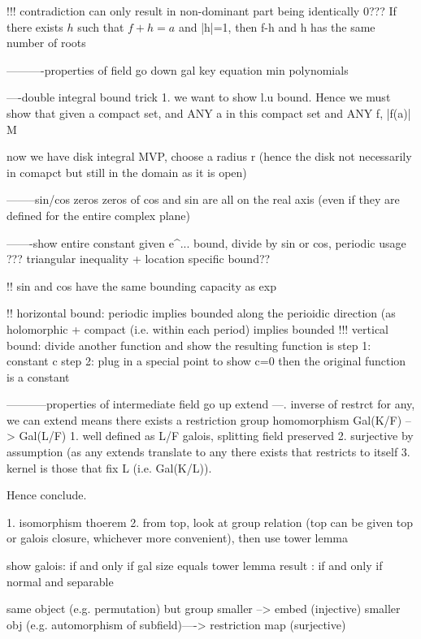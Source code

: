 {{!!! contradiction can only result in non-dominant part being identically 0???
If there exists $h$ such that $f + h = a$ and |h|=1, then f-h and h has the same number of roots





----------properties of field go down
gal key equation
min polynomials


----double integral bound trick
1. we want to show l.u bound. Hence we must show that given a compact set, and ANY a in this compact set and ANY f, |f(a)| \leq M

now we have disk integral MVP, choose a radius r (hence the disk not necessarily in comapct but still in the domain as it is open)


--------sin/cos zeros
zeros of cos and sin are all on the real axis (even if they are defined for the entire complex plane)

-------show entire constant given e^... bound, divide by sin or cos, periodic usage
??? triangular inequality + location specific bound??



!! sin and cos have the same bounding capacity as exp

!! horizontal bound: periodic implies bounded along the perioidic direction (as holomorphic + compact (i.e. within each period) implies bounded 
!!! vertical bound: divide another function and show the resulting function is
    step 1: constant c
    step 2: plug in a special point to show c=0
then the original function is a constant

-----------properties of intermediate field go up
extend ---. inverse of restrct
for any, we can extend means 
there exists a restriction group homomorphism Gal(K/F) --> Gal(L/F) 
1. well defined as L/F galois, splitting field preserved
2. surjective by assumption (as any extends translate to any there exists that restricts to itself
3. kernel is those that fix L (i.e. Gal(K/L)).

Hence conclude.


1. isomorphism thoerem
2. from top, look at group relation (top can be given top or galois closure, whichever more convenient), then use tower lemma

show galois: if and only if gal size equals tower lemma result
: if and only if normal and separable


same object (e.g. permutation) but group smaller --> embed (injective)
smaller obj (e.g. automorphism of subfield)----> restriction map (surjective)


}}
